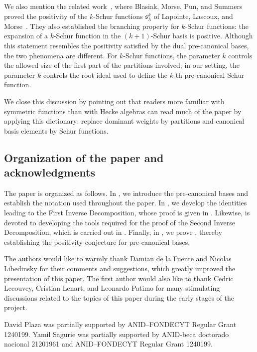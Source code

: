 We also mention the related work~\cite{blasiak2019catalan}, where Blasiak, Morse, Pun, and Summers proved the positivity of the $k$-Schur functions $\mathfrak{s}^k_\lambda$ of Lapointe, Lascoux, and Morse~\cite{luc2003}. They also established the branching property for $k$-Schur functions: the expansion of a $k$-Schur function in the $(k+1)$-Schur basis is positive. Although this statement resembles the positivity satisfied by the dual pre-canonical bases, the two phenomena are different. For $k$-Schur functions, the parameter $k$ controls the allowed size of the first part of the partitions involved; in our setting, the parameter $k$ controls the root ideal used to define the $k$-th pre-canonical Schur function.

We close this discussion by pointing out that readers more familiar with symmetric functions than with Hecke algebras can read much of the paper by applying this dictionary: replace dominant weights by partitions and canonical basis elements by Schur functions.

\subsection{Organization of the paper and acknowledgments}

The paper is organized as follows.
In , we introduce the pre-canonical bases and establish the notation used throughout the paper.
In , we develop the identities leading to the First Inverse Decomposition, whose proof is given in .
Likewise,  is devoted to developing the tools required for the proof of the Second Inverse Decomposition, which is carried out in .
Finally, in , we prove , thereby establishing the positivity conjecture for pre-canonical bases. 

\medskip

The authors would like to warmly thank Damian de la Fuente and Nicolas Libedinsky for their comments and suggestions, which greatly improved the presentation of this paper.
The first author would also like to thank Cedric Lecouvey, Cristian Lenart, and Leonardo Patimo for many stimulating discussions related to the topics of this paper during the early stages of the project.

\medskip

David Plaza was partially supported by ANID--FONDECYT Regular Grant 1240199.
Yamil Sagurie was partially supported by ANID-beca doctorado nacional 21201961 and ANID--FONDECYT Regular Grant 1240199.
